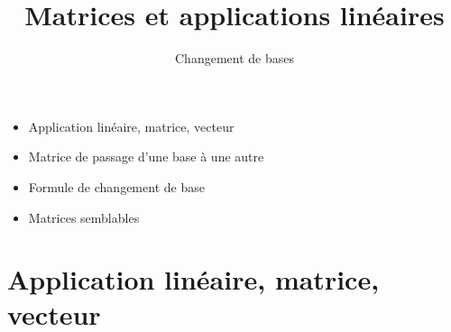 

 
\newcommand{\Pass}{\mathop{\text{P}}\nolimits}
   





\title{{\bf Matrices et applications linéaires}}
\subtitle{Changement de bases}

\begin{frame}
  
  \debutmontitre

  \pause

{\footnotesize
\hfill
{}
\begin{minipage}{0.6\textwidth}
  \begin{itemize}
    \item<3-> Application linéaire, matrice, vecteur
    \item<4-> Matrice de passage d'une base à une autre
    \item<5-> Formule de changement de base
    \item<6-> Matrices semblables
  \end{itemize}
\end{minipage}
}

\end{frame}

\setcounter{framenumber}{0}


\section{Application linéaire, matrice, vecteur}

